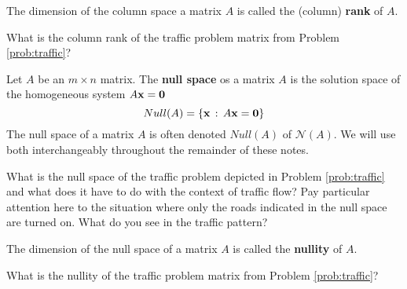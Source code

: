 \begin{definition}
    The dimension of the column space a matrix $A$ is called the (column) {\bf rank} of $A$.
\end{definition}
\begin{problem}
    What is the column rank of the traffic problem matrix from Problem \ref{prob:traffic}?
\end{problem}

\begin{definition}
        Let $A$ be an $m \times n$ matrix.  The {\bf null space} os a matrix $A$ is the
        solution space of the homogeneous system $A {\bf x} = {\bf 0}$ 
        \[ Null(A) = \{ {\bf x} \, : \,
        A{\bf x} = {\bf 0} \} \]
        The null space of a matrix $A$ is often denoted $Null(A)$ of $\mathcal{N}(A)$.  We
        will use both interchangeably throughout the remainder of these notes.
\end{definition}
\begin{problem}
    What is the null space of the traffic problem depicted in Problem \ref{prob:traffic}
    and what does it have to do with the context of traffic flow?  Pay particular
    attention here to the situation where only the roads indicated in the null space are
    turned on.  What do you see in the traffic pattern?  
\end{problem}

\begin{definition}
    The dimension of the null space of a matrix $A$ is called the {\bf nullity} of $A$.
\end{definition}
\begin{problem}
    What is the nullity of the traffic problem matrix from Problem \ref{prob:traffic}?
\end{problem}

